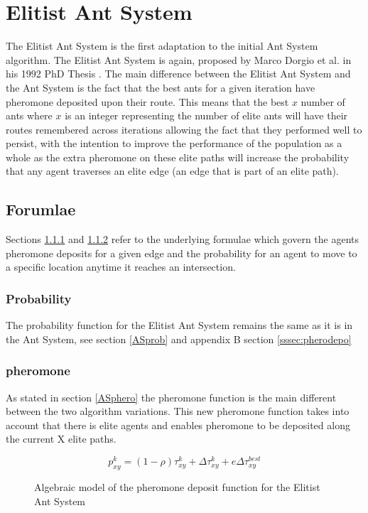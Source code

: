 \section{Elitist Ant System}
\label{eliteymcneaty}
The Elitist Ant System is the first adaptation to the initial Ant System algorithm. The Elitist Ant System is again, proposed by Marco Dorgio et al. in his 1992 PhD Thesis \cite{Dor1992:thesis}. The main difference between the Elitist Ant System and the Ant System is the fact that the best ants for a given iteration have pheromone deposited upon their route. This means that the best $x$ number of ants where $x$ is an integer representing the number of elite ants will have their routes remembered across iterations allowing the fact that they performed well to persist, with the intention to improve the performance of the population as a whole as the extra pheromone on these elite paths will increase the probability that any agent traverses an elite edge (an edge that is part of an elite path).

\subsection{Forumlae}

Sections \ref{EASprob} and \ref{EASphero} refer to the underlying formulae which govern the agents pheromone deposits for a given edge and the probability for an agent to move to a specific location anytime it reaches an intersection.

\subsubsection{Probability}
\label{EASprob}

The probability function for the Elitist Ant System remains the same as it is in the Ant System, see section \ref{ASprob} and appendix B section \ref{sssec:pherodepo}

\subsubsection{pheromone}
\label{EASphero}
As stated in section \ref{ASphero} the pheromone function is the main different between the two algorithm variations. This new pheromone function takes into account that there is elite agents and enables pheromone to be deposited along the current X elite paths.

\begin{figure}[H]
\Large
\begin{equation}
p_{xy}^{k} = (1 - \rho)\tau_{xy}^{k} + \Delta\tau_{xy}^{k} + e\Delta\tau_{xy}^{best}
\end{equation}

\caption{Algebraic model of the pheromone deposit function for the Elitist Ant System \cite{marcdorgio:book:EAS}}
\label{fig:EASpheromonefunc}

\end{figure}

